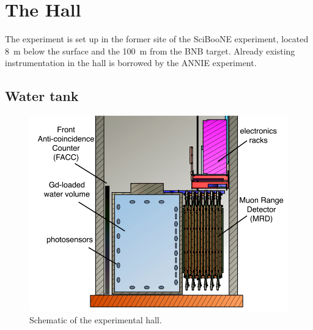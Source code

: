  \section{The Hall}
 
 The experiment is set up in the former site of the SciBooNE experiment, %
 located 8~m below the surface and the 100~m from the BNB target.
 Already existing instrumentation in the hall is borrowed by the ANNIE experiment.

 \subsection{Water tank}
 
 \begin{figure}
   \centering
   \includegraphics[scale=0.25]{pics/ANNIEreduced2}
   \caption{Schematic of the experimental hall.}
   \label{fig:anniehall}
 \end{figure}
 
